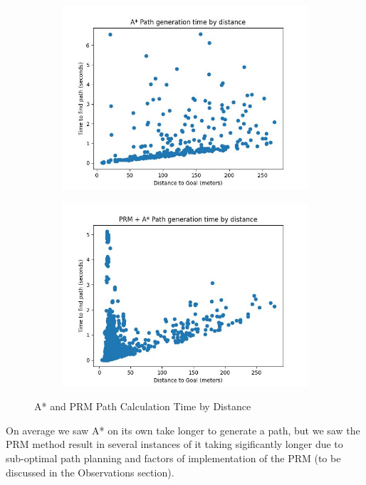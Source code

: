 \documentclass{article}
\begin{document}
\begin{figure}[H]
    \centering
    \begin{subfigure}{0.4\textwidth}
        \centering
        \includegraphics[width = \textwidth]{imgs/astar_paths.jpg}
    \end{subfigure}
    \begin{subfigure}{0.4\textwidth}
        \centering
        \includegraphics[width = \textwidth]{imgs/prm_paths.jpg}
    \end{subfigure}
    \caption{A* and PRM Path Calculation Time by Distance}
    \label{fig:calc-by-distance}
\end{figure}

On average we saw A* on its own take longer to generate a path, but we saw the PRM method result in several instances of it taking sigificantly longer due to sub-optimal path planning and factors of implementation of the PRM (to be discussed in the Observations section).
\end{document}
